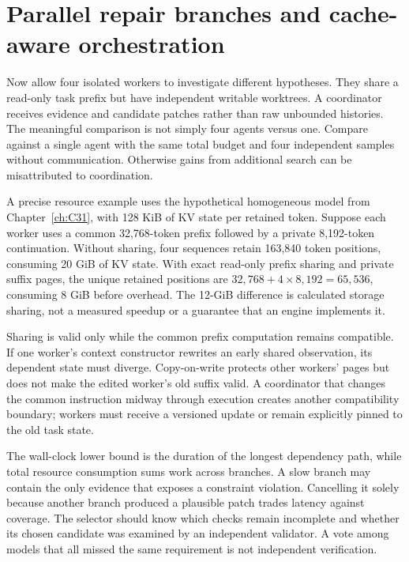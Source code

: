 \section{Parallel repair branches and cache-aware orchestration}\label{sec:C33:03}
Now allow four isolated workers to investigate different hypotheses. They share a read-only task prefix but have independent writable worktrees. A coordinator receives evidence and candidate patches rather than raw unbounded histories. The meaningful comparison is not simply four agents versus one. Compare against a single agent with the same total budget and four independent samples without communication. Otherwise gains from additional search can be misattributed to coordination.

A precise resource example uses the hypothetical homogeneous model from Chapter~\ref{ch:C31}, with 128 KiB of KV state per retained token. Suppose each worker uses a common 32,768-token prefix followed by a private 8,192-token continuation. Without sharing, four sequences retain 163,840 token positions, consuming 20 GiB of KV state. With exact read-only prefix sharing and private suffix pages, the unique retained positions are $32{,}768+4\times8{,}192=65{,}536$, consuming 8 GiB before overhead. The 12-GiB difference is calculated storage sharing, not a measured speedup or a guarantee that an engine implements it.

Sharing is valid only while the common prefix computation remains compatible. If one worker's context constructor rewrites an early shared observation, its dependent state must diverge. Copy-on-write protects other workers' pages but does not make the edited worker's old suffix valid. A coordinator that changes the common instruction midway through execution creates another compatibility boundary; workers must receive a versioned update or remain explicitly pinned to the old task state.

The wall-clock lower bound is the duration of the longest dependency path, while total resource consumption sums work across branches. A slow branch may contain the only evidence that exposes a constraint violation. Cancelling it solely because another branch produced a plausible patch trades latency against coverage. The selector should know which checks remain incomplete and whether its chosen candidate was examined by an independent validator. A vote among models that all missed the same requirement is not independent verification.


